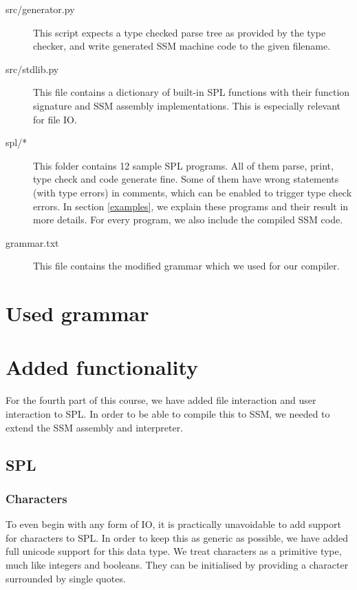 \documentclass[a4paper]{article}
\begin{document}
\begin{description}
        \item[src/generator.py] This script expects a type checked parse tree as provided by the type checker, and write generated SSM machine code to the given filename. 
  \item[src/stdlib.py] This file contains a dictionary of built-in SPL functions with their function signature and SSM assembly implementations. This is especially relevant for file IO. 
        \item[spl/*] This folder contains 12 sample SPL programs. All of them parse, print, type check and code generate fine. Some of them have wrong statements (with type errors) in comments, which can be enabled to trigger type check errors. In section \ref{examples}, we explain these programs and their result in more details. For every program, we also include the compiled SSM code. 
        \item[grammar.txt] This file contains the modified grammar which we used for our compiler.
\end{description}

\newpage
\section{Used grammar}


\newpage
\section{Added functionality}
\label{part4}
For the fourth part of this course, we have added file interaction and user interaction to SPL. In order to be able to compile this to SSM, we needed to extend the SSM assembly and interpreter.

\subsection{SPL}

\subsubsection{Characters}

To even begin with any form of IO, it is practically unavoidable to add support for characters to SPL. In order to keep this as generic as possible, we have added full unicode support for this data type. We treat characters as a primitive type, much like integers and booleans. They can be initialised by providing a character surrounded by single quotes.
\end{document}
